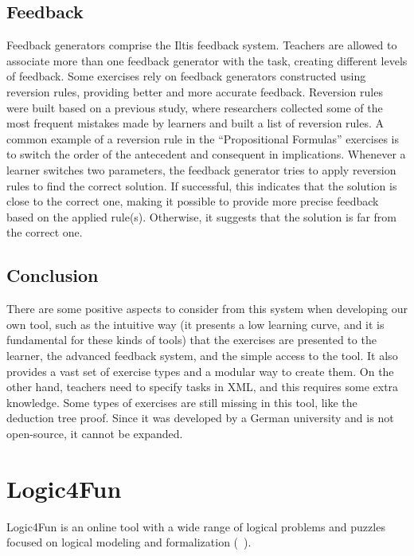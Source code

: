\subsection{Feedback}
\label{chap:iltis-feedback}
Feedback generators comprise the Iltis feedback system. Teachers are allowed to associate more than one feedback generator with the task, creating different levels of feedback. Some exercises rely on feedback generators constructed using reversion rules, providing better and more accurate feedback. Reversion rules were built based on a previous study, where researchers collected some of the most frequent mistakes made by learners and built a list of reversion rules. A common example of a reversion rule in the “Propositional Formulas” exercises is to switch the order of the antecedent and consequent in implications. Whenever a learner switches two parameters, the feedback generator tries to apply reversion rules to find the correct solution. If successful, this indicates that the solution is close to the correct one, making it possible to provide more precise feedback based on the applied rule(s). Otherwise, it suggests that the solution is far from the correct one.

\subsection{Conclusion}
There are some positive aspects to consider from this system when developing our own tool, such as the intuitive way (it presents a low learning curve, and it is fundamental for these kinds of tools) that the exercises are presented to the learner, the advanced feedback system, and the simple access to the tool. It also provides a vast set of exercise types and a modular way to create them. On the other hand, teachers need to specify tasks in XML, and this requires some extra knowledge. Some types of exercises are still missing in this tool, like the deduction tree proof. Since it was developed by a German university and is not open-source, it cannot be expanded.

\section{Logic4Fun}

Logic4Fun is an online tool with a wide range of logical problems and puzzles focused on logical modeling and formalization (~\cite{logic4fun}).

